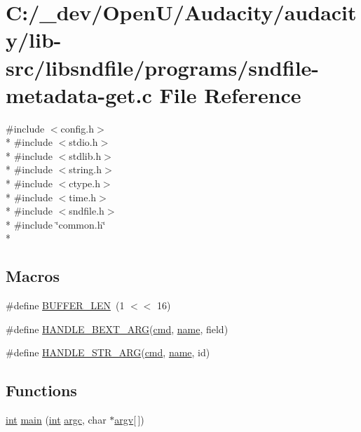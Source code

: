 \hypertarget{sndfile-metadata-get_8c}{}\section{C\+:/\+\_\+dev/\+Open\+U/\+Audacity/audacity/lib-\/src/libsndfile/programs/sndfile-\/metadata-\/get.c File Reference}
\label{sndfile-metadata-get_8c}
{\ttfamily \#include $<$config.\+h$>$}\\*
{\ttfamily \#include $<$stdio.\+h$>$}\\*
{\ttfamily \#include $<$stdlib.\+h$>$}\\*
{\ttfamily \#include $<$string.\+h$>$}\\*
{\ttfamily \#include $<$ctype.\+h$>$}\\*
{\ttfamily \#include $<$time.\+h$>$}\\*
{\ttfamily \#include $<$sndfile.\+h$>$}\\*
{\ttfamily \#include \char`\"{}common.\+h\char`\"{}}\\*
\subsection*{Macros}
\begin{DoxyCompactItemize}
\item 
\#define \hyperlink{sndfile-metadata-get_8c_a46130dc86f2322714bba26960b64e7bb}{B\+U\+F\+F\+E\+R\+\_\+\+L\+EN}~(1 $<$$<$ 16)
\item 
\#define \hyperlink{sndfile-metadata-get_8c_ad22b45a948158a60f12533dbeeefdab0}{H\+A\+N\+D\+L\+E\+\_\+\+B\+E\+X\+T\+\_\+\+A\+RG}(\hyperlink{sndfile__play_8m_adfc5ba7e22f5e4a6221c12a70503bef3}{cmd},  \hyperlink{lib_2expat_8h_a1b49b495b59f9e73205b69ad1a2965b0}{name},  field)
\item 
\#define \hyperlink{sndfile-metadata-get_8c_aa47e5e66d8fb8c6f637a1be7a56e4550}{H\+A\+N\+D\+L\+E\+\_\+\+S\+T\+R\+\_\+\+A\+RG}(\hyperlink{sndfile__play_8m_adfc5ba7e22f5e4a6221c12a70503bef3}{cmd},  \hyperlink{lib_2expat_8h_a1b49b495b59f9e73205b69ad1a2965b0}{name},  id)
\end{DoxyCompactItemize}
\subsection*{Functions}
\begin{DoxyCompactItemize}
\item 
\hyperlink{xmltok_8h_a5a0d4a5641ce434f1d23533f2b2e6653}{int} \hyperlink{sndfile-metadata-get_8c_a0ddf1224851353fc92bfbff6f499fa97}{main} (\hyperlink{xmltok_8h_a5a0d4a5641ce434f1d23533f2b2e6653}{int} \hyperlink{cmdline_8c_aaffeb1bf2056ea44af5b5d0ee4d6ff07}{argc}, char $\ast$\hyperlink{cmdline_8c_ad407d5ba91709bd9b092003858600723}{argv}\mbox{[}$\,$\mbox{]})
\end{DoxyCompactItemize}


